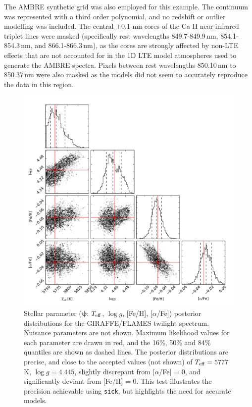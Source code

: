 \documentclass[iop]{emulateapj}
\newcommand{\sick}{\texttt{sick}}
\begin{document}
The AMBRE \citep{ambre} synthetic grid was also employed for this example. The 
continuum was represented with a third order polynomial, and no redshift or 
outlier modelling was included. The central $\pm$0.1 nm cores of the Ca II 
near-infrared triplet lines were masked (specifically rest wavelengths 
849.7-849.9\,nm, 854.1-854.3\,nm, and 866.1-866.3\,nm), as the cores are strongly 
affected by non-LTE effects that are not accounted for in the 1D LTE model atmospheres 
used to generate the AMBRE spectra. Pixels between rest wavelengths 850.10\,nm 
to 850.37\,nm were also masked as the models did not seem to accurately reproduce 
the data in this region. 

\begin{figure}
\label{fig:solar}
\includegraphics[width=\textwidth,height=\textwidth]{figures/solar.pdf}
\caption{Stellar parameter ($\bm{\psi}$: $T_{\rm eff}$, $\log{g}$, [Fe/H], 
[$\alpha$/Fe])  posterior distributions for the GIRAFFE/FLAMES twilight spectrum. 
Nuisance parameters are not shown. Maximum likelihood values for each parameter 
are drawn in red, and the 16\%, 50\% and 84\% quantiles are shown as dashed lines. 
The posterior distributions are precise, and close to the accepted values (not 
shown) of $T_{\rm eff} = 5777$\,K, $\log{g} = 4.445$, slightly discrepant from 
[$\alpha$/Fe] = 0, and significantly deviant from [Fe/H] = 0. This test 
illustrates the precision achievable using \sick, but highlights the need for 
accurate models.}
\end{figure}
\end{document}
